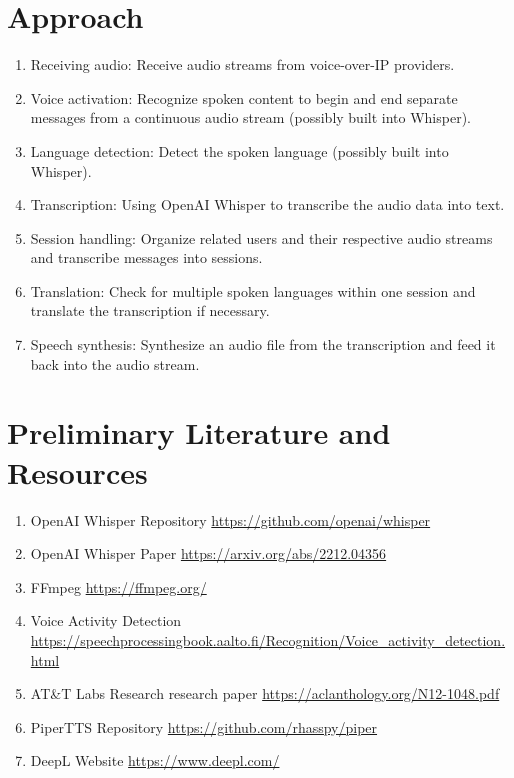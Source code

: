 \documentclass[a4paper,10pt]{article}
\begin{document}
\section{Approach}
\begin{enumerate}
  \item Receiving audio: Receive audio streams from voice-over-IP providers.
  \item Voice activation: Recognize spoken content to begin and end separate messages from a continuous audio stream (possibly built into Whisper).
  \item Language detection: Detect the spoken language  (possibly built into Whisper).
  \item Transcription: Using OpenAI Whisper to transcribe the audio data into text.
  \item Session handling: Organize related users and their respective audio streams and transcribe messages into sessions.
  \item Translation: Check for multiple spoken languages within one session and translate the transcription if necessary.
  \item Speech synthesis: Synthesize an audio file from the transcription and feed it back into the audio stream.
\end{enumerate}


\section{Preliminary Literature and Resources}
\begin{enumerate}
  \item OpenAI Whisper Repository \url{https://github.com/openai/whisper}
  \item OpenAI Whisper Paper \url{https://arxiv.org/abs/2212.04356}
  \item FFmpeg \url{https://ffmpeg.org/}
  \item Voice Activity Detection \url{https://speechprocessingbook.aalto.fi/Recognition/Voice_activity_detection.html}
  \item AT\&T Labs Research research paper \url{https://aclanthology.org/N12-1048.pdf}
  \item PiperTTS Repository \url{https://github.com/rhasspy/piper}
  \item DeepL Website \url{https://www.deepl.com/}
\end{enumerate}
\end{document}
